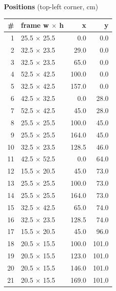 \documentclass[a4paper,landscape,10pt]{article}
\begin{document}
\begin{minipage}[t]{0.25\textwidth}
\vspace{8pt}
{\bfseries Positions} (top-left corner, cm)\\[2pt]
\tiny
\begin{tabular}{@{}r l r r@{}}
\toprule
\# & frame w $\times$ h & x & y \\
\midrule
1 & 25.5 $\times$ 25.5 & 0.0 & 0.0 \\
2 & 32.5 $\times$ 23.5 & 29.0 & 0.0 \\
3 & 32.5 $\times$ 23.5 & 65.0 & 0.0 \\
4 & 52.5 $\times$ 42.5 & 100.0 & 0.0 \\
5 & 32.5 $\times$ 42.5 & 157.0 & 0.0 \\
6 & 42.5 $\times$ 32.5 & 0.0 & 28.0 \\
7 & 52.5 $\times$ 42.5 & 45.0 & 28.0 \\
8 & 25.5 $\times$ 25.5 & 100.0 & 45.0 \\
9 & 25.5 $\times$ 25.5 & 164.0 & 45.0 \\
10 & 32.5 $\times$ 23.5 & 128.5 & 46.0 \\
11 & 42.5 $\times$ 52.5 & 0.0 & 64.0 \\
12 & 15.5 $\times$ 20.5 & 45.0 & 73.0 \\
13 & 25.5 $\times$ 25.5 & 100.0 & 73.0 \\
14 & 25.5 $\times$ 25.5 & 164.0 & 73.0 \\
15 & 32.5 $\times$ 42.5 & 65.0 & 74.0 \\
16 & 32.5 $\times$ 23.5 & 128.5 & 74.0 \\
17 & 15.5 $\times$ 20.5 & 45.0 & 96.0 \\
18 & 20.5 $\times$ 15.5 & 100.0 & 101.0 \\
19 & 20.5 $\times$ 15.5 & 123.0 & 101.0 \\
20 & 20.5 $\times$ 15.5 & 146.0 & 101.0 \\
21 & 20.5 $\times$ 15.5 & 169.0 & 101.0 \\
\bottomrule
\end{tabular}
\end{minipage}
\clearpage
\end{document}
